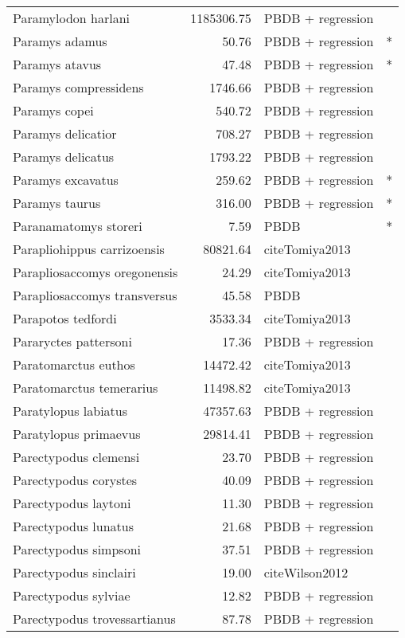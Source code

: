 \begin{table}[ht]
\begin{tabular}{lrll}
  Paramylodon harlani & 1185306.75 & PBDB + regression &  \\ 
  Paramys adamus & 50.76 & PBDB + regression & * \\ 
  Paramys atavus & 47.48 & PBDB + regression & * \\ 
  Paramys compressidens & 1746.66 & PBDB + regression &  \\ 
  Paramys copei & 540.72 & PBDB + regression &  \\ 
  Paramys delicatior & 708.27 & PBDB + regression &  \\ 
  Paramys delicatus & 1793.22 & PBDB + regression &  \\ 
  Paramys excavatus & 259.62 & PBDB + regression & * \\ 
  Paramys taurus & 316.00 & PBDB + regression & * \\ 
  Paranamatomys storeri & 7.59 & PBDB & * \\ 
  Parapliohippus carrizoensis & 80821.64 & cite{Tomiya2013} &  \\ 
  Parapliosaccomys oregonensis & 24.29 & cite{Tomiya2013} &  \\ 
  Parapliosaccomys transversus & 45.58 & PBDB &  \\ 
  Parapotos tedfordi & 3533.34 & cite{Tomiya2013} &  \\ 
  Pararyctes pattersoni & 17.36 & PBDB + regression &  \\ 
  Paratomarctus euthos & 14472.42 & cite{Tomiya2013} &  \\ 
  Paratomarctus temerarius & 11498.82 & cite{Tomiya2013} &  \\ 
  Paratylopus labiatus & 47357.63 & PBDB + regression &  \\ 
  Paratylopus primaevus & 29814.41 & PBDB + regression &  \\ 
  Parectypodus clemensi & 23.70 & PBDB + regression &  \\ 
  Parectypodus corystes & 40.09 & PBDB + regression &  \\ 
  Parectypodus laytoni & 11.30 & PBDB + regression &  \\ 
  Parectypodus lunatus & 21.68 & PBDB + regression &  \\ 
  Parectypodus simpsoni & 37.51 & PBDB + regression &  \\ 
  Parectypodus sinclairi & 19.00 & cite{Wilson2012} &  \\ 
  Parectypodus sylviae & 12.82 & PBDB + regression &  \\ 
  Parectypodus trovessartianus & 87.78 & PBDB + regression &  \\ 

\end{tabular}
\end{table}
